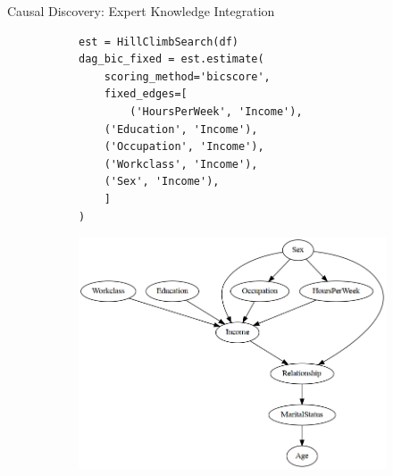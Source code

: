 \documentclass[aspectratio=169]{beamer}
\begin{document}
\begin{frame}[fragile]{Causal Discovery: Expert Knowledge Integration}
	\begin{figure}
		\begin{subfigure}{0.5 \textwidth}
			\begin{verbatim}
est = HillClimbSearch(df)
dag_bic_fixed = est.estimate(
    scoring_method='bicscore',
    fixed_edges=[
        ('HoursPerWeek', 'Income'),
	('Education', 'Income'),
	('Occupation', 'Income'),
	('Workclass', 'Income'),
	('Sex', 'Income'),
	]
)
			\end{verbatim}
		\end{subfigure}%
		\begin{subfigure}{0.5 \textwidth}
			\centering
			\includegraphics[scale=0.3]{imgs/adult_bic_fixed.png}
		\end{subfigure}
	\end{figure}
\end{frame}
\end{document}
